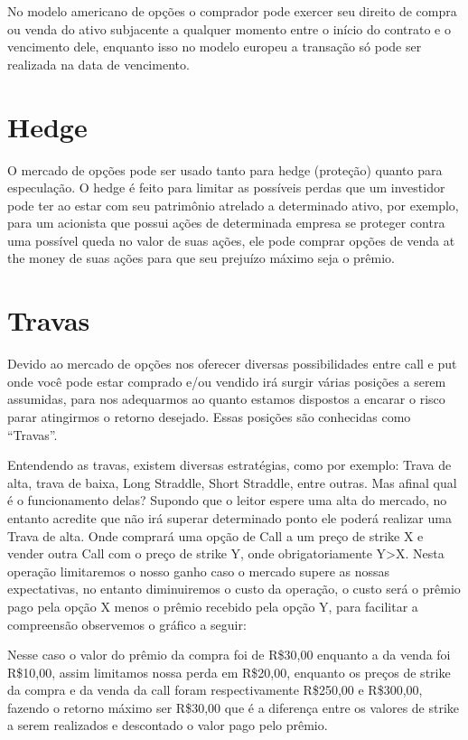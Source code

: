 \documentclass[]{book}
\begin{document}
No modelo americano de opções o comprador pode exercer seu direito de
compra ou venda do ativo subjacente a qualquer momento entre o início do
contrato e o vencimento dele, enquanto isso no modelo europeu a
transação só pode ser realizada na data de vencimento.

\section{Hedge}\label{hedge}

O mercado de opções pode ser usado tanto para hedge (proteção) quanto
para especulação. O hedge é feito para limitar as possíveis perdas que
um investidor pode ter ao estar com seu patrimônio atrelado a
determinado ativo, por exemplo, para um acionista que possui ações de
determinada empresa se proteger contra uma possível queda no valor de
suas ações, ele pode comprar opções de venda at the money de suas ações
para que seu prejuízo máximo seja o prêmio.

\section{Travas}\label{travas}

Devido ao mercado de opções nos oferecer diversas possibilidades entre
call e put onde você pode estar comprado e/ou vendido irá surgir várias
posições a serem assumidas, para nos adequarmos ao quanto estamos
dispostos a encarar o risco parar atingirmos o retorno desejado. Essas
posições são conhecidas como ``Travas''.

Entendendo as travas, existem diversas estratégias, como por exemplo:
Trava de alta, trava de baixa, Long Straddle, Short Straddle, entre
outras. Mas afinal qual é o funcionamento delas? Supondo que o leitor
espere uma alta do mercado, no entanto acredite que não irá superar
determinado ponto ele poderá realizar uma Trava de alta. Onde comprará
uma opção de Call a um preço de strike X e vender outra Call com o preço
de strike Y, onde obrigatoriamente Y\textgreater{}X. Nesta operação
limitaremos o nosso ganho caso o mercado supere as nossas expectativas,
no entanto diminuiremos o custo da operação, o custo será o prêmio pago
pela opção X menos o prêmio recebido pela opção Y, para facilitar a
compreensão observemos o gráfico a seguir:

Nesse caso o valor do prêmio da compra foi de R\$30,00 enquanto a da
venda foi R\$10,00, assim limitamos nossa perda em R\$20,00, enquanto os
preços de strike da compra e da venda da call foram respectivamente
R\$250,00 e R\$300,00, fazendo o retorno máximo ser R\$30,00 que é a
diferença entre os valores de strike a serem realizados e descontado o
valor pago pelo prêmio.
\end{document}
